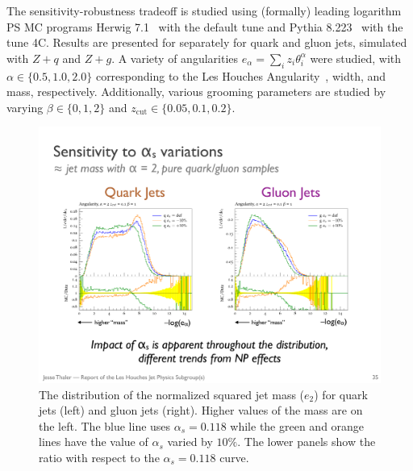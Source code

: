 The sensitivity-robustness tradeoff is studied using (formally) leading logarithm PS MC programs Herwig 7.1~\cite{Bellm:2015jjp,Reichelt:2017hts} with the default tune and Pythia 8.223~\cite{Sjostrand:2006za,Sjostrand:2014zea} with the tune 4C.  Results are presented for separately for quark and gluon jets, simulated with $Z+q$ and $Z+g$.  A variety of angularities $e_\alpha=\sum_iz_i\theta_i^\alpha$ were studied, with $\alpha\in\{0.5,1.0, 2.0\}$ corresponding to the Les Houches Angularity~\cite{Gras:2017jty}, width, and mass, respectively.  Additionally, various grooming parameters are studied by varying $\beta\in\{0,1,2\}$ and $z_\text{cut}\in \{0.05,0.1,0.2\}$.  

\begin{figure}[h!]
\begin{center}
\includegraphics[width = 0.99\columnwidth]{figures/sensitivity.pdf}
\end{center}
\caption{The distribution of the normalized squared jet mass ($e_2$) for quark jets (left) and gluon jets (right).  Higher values of the mass are on the left.  The blue line uses $\alpha_s=0.118$ while the green and orange lines have the value of $\alpha_s$ varied by $10\%$.  The lower panels show the ratio with respect to the $\alpha_s=0.118$ curve.}
\label{fig:sensitivity}
\end{figure}

